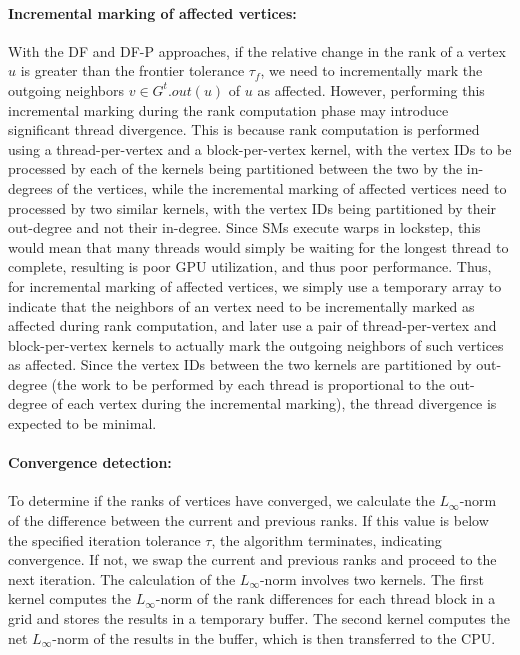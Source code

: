 \paragraph{Incremental marking of affected vertices:}

With the DF and DF-P approaches, if the relative change in the rank of a vertex $u$ is greater than the frontier tolerance $\tau_f$, we need to incrementally mark the outgoing neighbors $v \in G^t.out(u)$ of $u$ as affected. However, performing this incremental marking during the rank computation phase may introduce significant thread divergence. This is because rank computation is performed using a thread-per-vertex and a block-per-vertex kernel, with the vertex IDs to be processed by each of the kernels being partitioned between the two by the in-degrees of the vertices, while the incremental marking of affected vertices need to processed by two similar kernels, with the vertex IDs being partitioned by their out-degree and not their in-degree. Since SMs execute warps in lockstep, this would mean that many threads would simply be waiting for the longest thread to complete, resulting is poor GPU utilization, and thus poor performance. Thus, for incremental marking of affected vertices, we simply use a temporary array to indicate that the neighbors of an vertex need to be incrementally marked as affected during rank computation, and later use a pair of thread-per-vertex and block-per-vertex kernels to actually mark the outgoing neighbors of such vertices as affected. Since the vertex IDs between the two kernels are partitioned by out-degree (the work to be performed by each thread is proportional to the out-degree of each vertex during the incremental marking), the thread divergence is expected to be minimal.

\paragraph{Convergence detection:}

To determine if the ranks of vertices have converged, we calculate the $L_\infty$-norm of the difference between the current and previous ranks. If this value is below the specified iteration tolerance $\tau$, the algorithm terminates, indicating convergence. If not, we swap the current and previous ranks and proceed to the next iteration. The calculation of the $L_\infty$-norm involves two kernels. The first kernel computes the $L_\infty$-norm of the rank differences for each thread block in a grid and stores the results in a temporary buffer. The second kernel computes the net $L_\infty$-norm of the results in the buffer, which is then transferred to the CPU.


